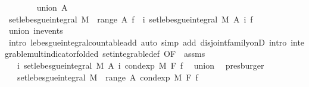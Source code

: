 \begin{isabellebody}
\isanewline
\ \ \ \ \ \ \isamarkupfalse%
\ {\isacharparenleft}{\kern0pt}union\ A{\isacharparenright}{\kern0pt}\isanewline
\ \ \ \ \ \ \isamarkupfalse%
\ {\isachardoublequoteopen}set{\isacharunderscore}{\kern0pt}lebesgue{\isacharunderscore}{\kern0pt}integral\ M\ {\isacharparenleft}{\kern0pt}{\isasymUnion}\ {\isacharparenleft}{\kern0pt}range\ A{\isacharparenright}{\kern0pt}{\isacharparenright}{\kern0pt}\ f\ {\isacharequal}{\kern0pt}\ {\isacharparenleft}{\kern0pt}{\isasymSum}i{\isachardot}{\kern0pt}\ set{\isacharunderscore}{\kern0pt}lebesgue{\isacharunderscore}{\kern0pt}integral\ M\ {\isacharparenleft}{\kern0pt}A\ i{\isacharparenright}{\kern0pt}\ f{\isacharparenright}{\kern0pt}{\isachardoublequoteclose}\ \isanewline
\ \ \ \ \ \ \ \ \isamarkupfalse%
\ union\ in{\isacharunderscore}{\kern0pt}events\isanewline
\ \ \ \ \ \ \ \ \isamarkupfalse%
\ {\isacharparenleft}{\kern0pt}intro\ lebesgue{\isacharunderscore}{\kern0pt}integral{\isacharunderscore}{\kern0pt}countable{\isacharunderscore}{\kern0pt}add{\isacharparenright}{\kern0pt}\ {\isacharparenleft}{\kern0pt}auto\ simp\ add{\isacharcolon}{\kern0pt}\ disjoint{\isacharunderscore}{\kern0pt}family{\isacharunderscore}{\kern0pt}onD\ intro{\isacharbang}{\kern0pt}{\isacharcolon}{\kern0pt}\ integrable{\isacharunderscore}{\kern0pt}mult{\isacharunderscore}{\kern0pt}indicator{\isacharbrackleft}{\kern0pt}folded\ set{\isacharunderscore}{\kern0pt}integrable{\isacharunderscore}{\kern0pt}def{\isacharcomma}{\kern0pt}\ OF\ {\isacharunderscore}{\kern0pt}\ assms{\isacharparenleft}{\kern0pt}{}{\isacharparenright}{\kern0pt}{\isacharbrackright}{\kern0pt}{\isacharparenright}{\kern0pt}\ \isanewline
\ \ \ \ \ \ \isamarkupfalse%
\ \isamarkupfalse%
\ {\isachardoublequoteopen}{\isachardot}{\kern0pt}{\isachardot}{\kern0pt}{\isachardot}{\kern0pt}\ {\isacharequal}{\kern0pt}\ {\isacharparenleft}{\kern0pt}{\isasymSum}i{\isachardot}{\kern0pt}\ set{\isacharunderscore}{\kern0pt}lebesgue{\isacharunderscore}{\kern0pt}integral\ M\ {\isacharparenleft}{\kern0pt}A\ i{\isacharparenright}{\kern0pt}\ {\isacharparenleft}{\kern0pt}cond{\isacharunderscore}{\kern0pt}exp\ M\ F\ f{\isacharparenright}{\kern0pt}{\isacharparenright}{\kern0pt}{\isachardoublequoteclose}\ \isamarkupfalse%
\ union\ \isamarkupfalse%
\ presburger\isanewline
\ \ \ \ \ \ \isamarkupfalse%
\ \isamarkupfalse%
\ {\isachardoublequoteopen}{\isachardot}{\kern0pt}{\isachardot}{\kern0pt}{\isachardot}{\kern0pt}\ {\isacharequal}{\kern0pt}\ set{\isacharunderscore}{\kern0pt}lebesgue{\isacharunderscore}{\kern0pt}integral\ M\ {\isacharparenleft}{\kern0pt}{\isasymUnion}\ {\isacharparenleft}{\kern0pt}range\ A{\isacharparenright}{\kern0pt}{\isacharparenright}{\kern0pt}\ {\isacharparenleft}{\kern0pt}cond{\isacharunderscore}{\kern0pt}exp\ M\ F\ f{\isacharparenright}{\kern0pt}{\isachardoublequoteclose}\isanewline

\end{isabellebody}
